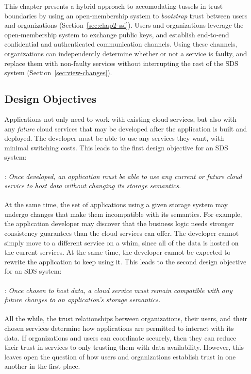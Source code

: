 This chapter presents a hybrid approach to accomodating tussels in trust
boundaries by using an open-membership system to \emph{bootstrap} trust between
users and organizations (Section~\ref{sec:chap2-ssi}).  Users and
organizations leverage the open-membership system to exchange public keys, and
establish end-to-end confidential and authenticated communication channels.
Using these channels, organizations can independently determine whether or not a
service is faulty, and replace them with non-faulty services without
interrupting the rest of the SDS system (Section~\ref{sec:view-changes}).

\subsection{Design Objectives}

Applications not only need to work with existing cloud services, but also with
any \emph{future} cloud services that may be developed after the application is
built and deployed.  The developer must be able to use any services they want,
with minimal switching costs.  This leads to the first design objective for an SDS
system:
\\
\\
: \emph{Once developed, an application must be
able to use any current or future 
cloud service to host data without changing its storage semantics.}
\\
\\
At the same time, the set of applications using a given storage system may
undergo changes that make them incompatible with its semantics.  For example,
the application developer may discover that the business logic needs stronger
consistency guarantees than the cloud services can offer.  The developer cannot
simply move to a different service on a whim, since all of the data is hosted 
on the current services.  At the same time, the developer cannot be expected
to rewrite the application to keep using it.  This leads to the second design
objective for an SDS system:
\\
\\
: \emph{Once chosen to host data, a cloud service must remain compatible with any
future changes to an application's storage semantics.}
\\
\\
All the while, the trust relationships between organizations, their users, and
their chosen services determine how applications are permitted to
interact with its data.  If organizations and users can coordinate securely,
then they can reduce their trust in services to only trusting them
with data availability.  However, this leaves open the question of how users and
organizations establish trust in one another in the first place.

